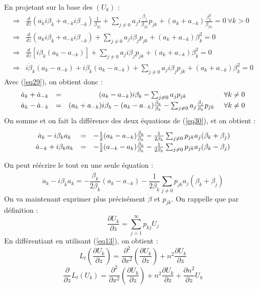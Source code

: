 \documentclass{article}
\begin{document}
En projetant sur la base des $(U_k)$ :
\begin{eqnarray*}
\Rightarrow& \frac{d}{dz} (a_ki\beta_k+a_{-k}i\beta_{-k})\frac{1}{\beta_{|k|}} + \sum_{j\neq 0} a_ji\frac{\beta_j}{\beta_{|k|}}p_{jk}+(a_k+a_{-k})\frac{\beta_k^2}{\beta_{|k|}}=0\ \forall k>0\\
\Rightarrow& \frac{d}{dz} (a_ki\beta_k+a_{-k}i\beta_{-k})+ \sum_{j\neq 0} a_ji\beta_jp_{jk}+(a_k+a_{-k})\beta_k^2=0\\
\Rightarrow& \frac{d}{dz} [i\beta_k(a_k-a_{-k})]+\sum_{j\neq 0} a_ji\beta_jp_{jk}+(a_k+a_{-k})\beta_k^2=0\\
\Rightarrow& i\dot{\beta}_k(a_k-a_{-k})+i\beta_k(\dot{a}_k-\dot{a}_{-k})+\sum_{j\neq 0} a_ji\beta_jp_{jk}+(a_k+a_{-k})\beta_k^2=0
\end{eqnarray*}
Avec (\ref{eq29}), on obtient donc :
\begin{equation} \label{eq30}
\begin{array}{c c c c}
	\dot{a}_k+\dot{a}_{-k}&=&(a_k-a_{-k})i\beta_k-\sum_{j\neq 0} a_j p_{jk} &\forall k\neq 0\\
	\dot{a}_k-\dot{a}_{-k}&=&(a_k+a_{-k})i\beta_k-(a_k-a_{-k})\frac{\dot{\beta}_k}{\beta_k}-\sum_{j\neq 0}a_j\frac{\beta_j}{\beta_k}p_{jk}\ &\forall k\neq 0\\
\end{array}
\end{equation}
On somme et on fait la différence des deux équations de (\ref{eq30}), et on obtient :
\begin{equation} \label{eq31}
\begin{array}{c c c}
\dot{a}_k-i\beta_ka_k&=&-\frac{1}{2}(a_k-a_{-k})\frac{\dot{\beta}_k}{\beta_k}-\frac{1}{2\beta_k}\sum_{j\neq 0}p_{jk}a_j(\beta_k+\beta_j)\\
\dot{a}_{-k}+i\beta_ka_k&=&-\frac{1}{2}(a_{-k}-a_k)\frac{\dot{\beta}_k}{\beta_k}-\frac{1}{2\beta_k}\sum_{j\neq 0}p_{jk}a_j(\beta_k-\beta_j)\\
\end{array}\end{equation}

On peut réécrire le tout en une seule équation : 
\begin{equation}\label{eq32}
\dot{a}_k-i\beta_ka_k=-\frac{\dot{\beta}_k}{2\beta_k}(a_k-a_{-k})-\frac{1}{2\beta_k}\sum_{j\neq 0}p_{jk}a_j(\beta_k+\beta_j)
\end{equation}
On va maintenant exprimer plus précisément $\dot{\beta}$ et $p_{jk}$. On rappelle que par définition :
\[\frac{\partial U_k}{\partial z}=\sum_{j=1}^\infty p_{kj}U_j\]
En différentiant en utilisant (\ref{eq13}), on obtient :
\[L_t\left( \frac{\partial U_k}{\partial z}\right)=\frac{\partial^2}{\partial x^2}\left(\frac{\partial U_k}{\partial z}\right) + n^2\frac{\partial U_k}{\partial z}\]
\[\frac{\partial }{\partial z}L_t\left( U_k\right)=\frac{\partial^2}{\partial x^2}\left(\frac{\partial U_k}{\partial z}\right) + n^2\frac{\partial U_k}{\partial z}+\frac{\partial n^2}{\partial z} U_k\]
\end{document}
